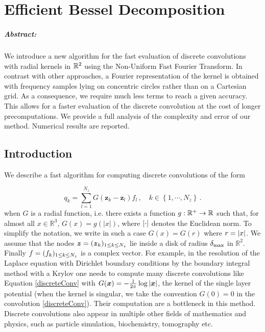 \documentclass[main]{subfiles}
\begin{document}
\chapter{Efficient Bessel Decomposition}
\label{chap:EBD}


\paragraph{\bfseries{Abstract}:}We introduce a new algorithm for the fast evaluation of discrete convolutions with radial kernels in $\mathbb{R}^2$ using the Non-Uniform Fast Fourier Transform. In contrast with other approaches, a Fourier representation of the kernel is obtained with frequency samples lying on concentric circles rather than on a Cartesian grid. As a consequence, we require much less terms to reach a given accuracy. This allows for a faster evaluation of the discrete convolution at the cost of longer precomputations. We provide a full analysis of the complexity and error of our method. Numerical results are reported.



\section*{Introduction}

We describe a fast algorithm for computing discrete convolutions of the form

\begin{equation}
q_k = \sum_{l = 1}^{N_z} G(\boldsymbol{z}_k - \boldsymbol{z}_l) f_l\,, \quad k \in \left\{1, \cdots, N_z\right\}\,.
\label{discreteConv}					
\end{equation}
when $G$ is a radial function, i.e. there exists a function $g : \mathbb{R}^+ \to \mathbb{R}$ such that, for almost all $x \in \mathbb{R}^3$, $G(x) = g(|x|)$, where $\left\lvert \cdot \right\rvert$ denotes the Euclidean norm. To simplify the notation, we write in such a case $G(x) = G(r)$ where $r = \left\lvert x \right\rvert$. We assume that the nodes $\boldsymbol{z} = (\boldsymbol{z}_{k})_{1 \leq k \leq N_z}$ lie inside a disk of radius $\delta_{\max}$ in $\mathbb{R}^2$. Finally $f = (f_{k})_{1 \leq k \leq N_z}$ is a complex vector. For example, in the resolution of the Laplace equation with Dirichlet boundary conditions by the boundary integral method with a Krylov one needs to compute many discrete convolutions like Equation \eqref{discreteConv} with $G(\boldsymbol{x}) = -\frac{1}{2\pi}\log \left\lvert \boldsymbol{x} \right\rvert$, the kernel of the single layer potential (when the kernel is singular, we take the convention $G(0) = 0$ in the convolution \eqref{discreteConv}). Their computation are a bottleneck in this method. Discrete convolutions also appear in multiple other fields of mathematics and physics, such as particle simulation, biochemistry, tomography etc.
\end{document}
